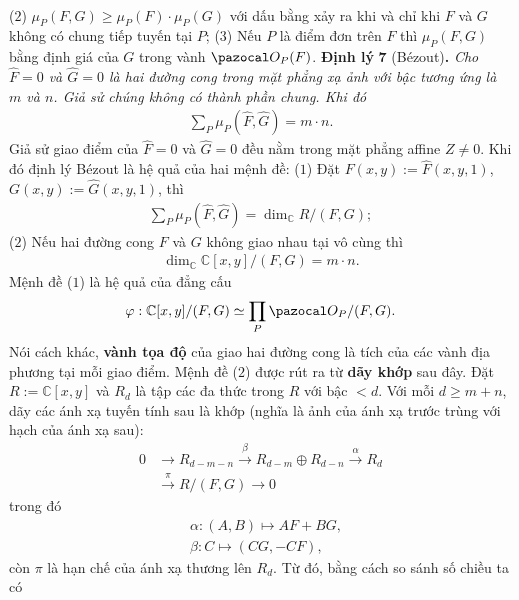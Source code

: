 \begin{multicols}{2}
\begin{align*}
	\end{align*}
	($2$) $\mu_P(F,G)\geq \mu_P(F)\cdot \mu_P(G)$ với dấu bằng xảy ra khi và chỉ khi $F$ và $G$ không có chung tiếp tuyến tại $P$;
	\vskip 0.1cm
	($3$) Nếu $P$ là điểm đơn trên $F$  thì $\mu_P(F,G)$ bằng định giá của $G$ trong vành $\pazocal O_P(F)$. 
	\vskip 0.1cm
	\textbf{\color{duongvaotoanhoc}Định lý} $\pmb{7}$ (Bézout)\textbf{\color{duongvaotoanhoc}.} \textit{Cho $\widehat F=0$ và $\widehat G=0$ là hai đường cong  trong mặt phẳng xạ ảnh với bậc tương ứng là $m$ và $n$. Giả sử chúng không có thành phần chung. Khi đó}
	\begin{align*}
		\sum_P\mu_P(\widehat F,\widehat G)=m\cdot n.
	\end{align*}
	Giả sử giao điểm của  $\widehat F=0$ và $\widehat G=0$ đều nằm trong mặt phẳng affine $Z\neq 0$. 
	Khi đó  định lý Bézout là hệ quả của hai mệnh đề:
	\vskip 0.1cm
	($1$) Đặt $F(x,y):=\widehat F(x,y,1)$, $G(x,y):=\widehat G(x,y,1)$, thì 
		\begin{align*}
			\sum_P\mu_P(\widehat F,\widehat G)=\dim_{\mathbb C}R/(F,G);
		\end{align*}
	($2$) Nếu hai đường cong $F$  và $G$  không giao nhau tại vô cùng thì 
		\begin{align*}
			\dim_{\mathbb C}\mathbb C[x,y]/(F,G)= m\cdot n.
		\end{align*}
	Mệnh đề ($1$) là hệ quả của đẳng cấu
	\begin{align*}
		\varphi:\mathbb C[x,y]/(F,G)\simeq \prod_P \pazocal O_P/(F,G).
	\end{align*}
	Nói cách khác, {\bf\color{duongvaotoanhoc} vành tọa độ} của giao hai đường cong là tích của các vành địa phương tại mỗi giao điểm.
	\vskip 0.1cm
	Mệnh đề ($2$) được rút ra từ  \textbf{\color{duongvaotoanhoc}dãy khớp}  sau đây. Đặt $R:=\mathbb C[x,y]$ và $R_d$ là tập các đa thức trong $R$ với bậc $<d$.
	Với mỗi $d\geq m+n$, dãy các ánh xạ tuyến tính sau là khớp (nghĩa là ảnh của ánh xạ trước trùng với hạch của ánh xạ sau):
	\begin{align*}
		0&\longrightarrow R_{d-m-n}\stackrel\beta\longrightarrow 
		R_{d-m}\oplus R_{d-n} \stackrel\alpha\longrightarrow R_d\\
		&\stackrel\pi\longrightarrow R/(F,G)\longrightarrow 0	
	\end{align*}
	trong đó  
	\begin{align*}
		&\alpha: (A,B)\longmapsto AF+BG,\\
		&\beta: C\longmapsto (CG,-CF),
	\end{align*}
	còn $\pi$ là hạn chế của ánh xạ thương lên $R_d$. Từ đó, bằng cách so sánh số chiều ta có 

\end{multicols}
